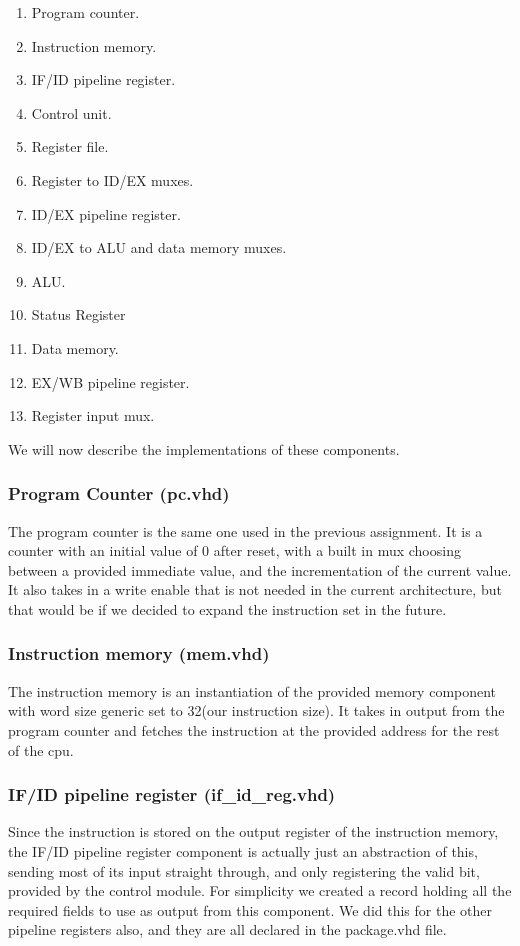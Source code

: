 \documentclass[11pt]{report}
\begin{document}
\begin{enumerate}
\item Program counter.
\item Instruction memory.
\item IF/ID pipeline register.
\item Control unit.
\item Register file.
\item Register to ID/EX muxes.
\item ID/EX pipeline register.
\item ID/EX to ALU and data memory muxes.
\item ALU.
\item Status Register
\item Data memory.
\item EX/WB pipeline register.
\item Register input mux.
\end{enumerate}
	
We will now describe the implementations of these components.
\subsubsection*{Program Counter (pc.vhd)}
The program counter is the same one used in the previous assignment. 
It is a counter with an initial value of 0 after reset, with a built in
mux choosing between a provided immediate value, and the incrementation of
the current value. It also takes in a write enable that is not needed in
the current architecture, but that would be if we decided to expand the 
instruction set in the future.

\subsubsection*{Instruction memory (mem.vhd)}
The instruction memory is an instantiation of the provided memory component
with word size generic set to 32(our instruction size). It takes in
output from the program counter and fetches the instruction at the provided
address for the rest of the cpu.
\subsubsection*{IF/ID pipeline register (if_id_reg.vhd)}
Since the instruction is stored on the output register of the instruction memory,
the IF/ID pipeline register component is actually just an abstraction of this, sending 
most of its input straight through, and only registering the valid bit, provided by
the control module. For simplicity we created a record holding all the required fields
to use as output from this component. We did this for the other pipeline registers
also, and they are all declared in the package.vhd file.
\end{document}
